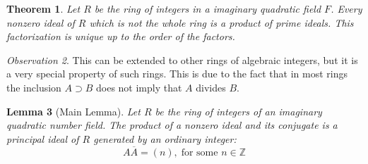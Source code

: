 \documentclass[12pt]{article}
\newtheorem{thm}{Theorem}[section]
\newtheorem{lem}[thm]{Lemma}  %
\theoremstyle{definition}
\theoremstyle{remark}
\newtheorem{obs}[thm]{Observation}
\numberwithin{equation}{section}
\newcommand\Z{\mathbb Z}    %
\begin{document}
\vspace{15pt}


\begin{thm}
        Let $R$ be the ring of integers in a imaginary quadratic field $F$. Every nonzero ideal of $R$ which is not the whole ring is a product of prime ideals. This factorization is unique up to the order of the factors.
\end{thm}

\begin{obs}
        This can be extended to other rings of algebraic integers, but it is a very special property of such rings. This is due to the fact that in most rings the inclusion $A \supset B$ does not imply that $A$ divides $B$.
\end{obs}

\vspace{15pt}

\begin{lem}[Main Lemma]
        Let $R$ be the ring of integers of an imaginary quadratic number field. The product of a nonzero ideal and its conjugate is a principal ideal of $R$ generated by an ordinary integer:\begin{equation}
                A\overline{A} = (n),\;\text{for some } n \in \Z
        \end{equation}
\end{lem}

\vspace{15pt}
\end{document}
